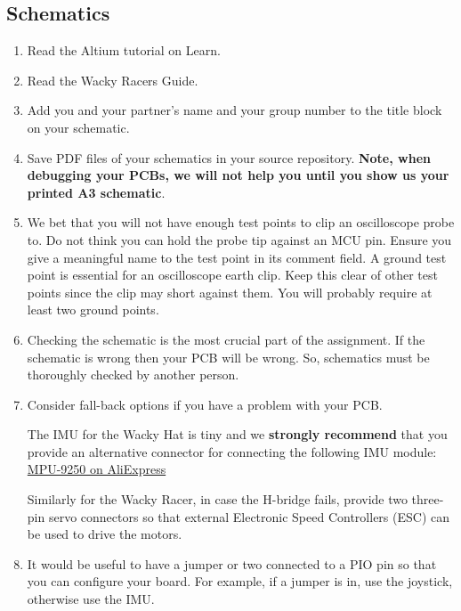 \documentclass[11pt, a4paper]{article}
\begin{document}
\subsection{Schematics}

\begin{enumerate}
\item Read the Altium tutorial on Learn.


\item Read the Wacky Racers Guide.

\item Add you and your partner's name and your group number to the
  title block on your schematic.

\item Save PDF files of your schematics in your source repository.
  \textbf{Note, when debugging your PCBs, we will not help you until
    you show us your printed A3 schematic}.

\item We bet that you will not have enough test points to clip an oscilloscope
  probe to.  Do not think you can hold the probe tip against an MCU pin.  Ensure
  you give a meaningful name to the test point in its comment field.  A ground
  test point is essential for an oscilloscope earth clip. Keep this clear of
  other test points since the clip may short against them.  You will probably
  require at least two ground points.

\item Checking the schematic is the most crucial part of the
  assignment.  If the schematic is wrong then your PCB will be wrong.
  So, schematics must be thoroughly checked by another person.

\item Consider fall-back options if you have a problem with your PCB.

  The IMU for the Wacky Hat is tiny and we \textbf{strongly recommend} that you
  provide an alternative connector for connecting the following IMU module:
  \href{https://www.aliexpress.com/item/SPI-IIC-MPU9250-MPU-9250-MPU-9250-9-Axis-Attitude-Gyro-Accelerator-Magnetometer-Sensor-Module-MPU9250/32216818498.html?spm=a2g0s.9042311.0.0.WKvtEm}{MPU-9250 on AliExpress}

  Similarly for the Wacky Racer, in case the H-bridge fails, provide two
  three-pin servo connectors so that external Electronic Speed
  Controllers (ESC) can be used to drive the motors.

\item It would be useful to have a jumper or two connected to a PIO
  pin so that you can configure your board.  For example, if a jumper
  is in, use the joystick, otherwise use the IMU.

\end{enumerate}
\end{document}
